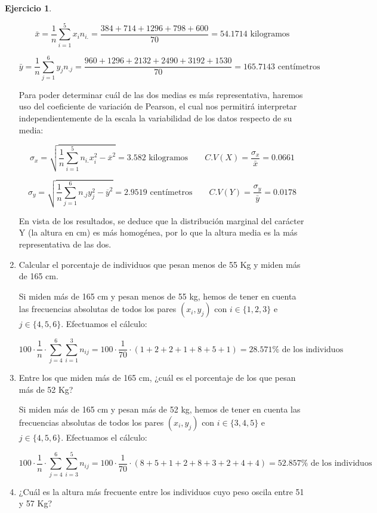 \documentclass[a4paper, 12pt]{article}
\theoremstyle{definition}
\newtheorem{ej}{Ejercicio}
\begin{document}
\begin{ej}
\begin{enumerate}[label=\alph*)]
\[
	\bar{x} = \frac{1}{n} \sum_{i=1}^{5} x_i n_{i.} = \frac{384+714+1296+798+600}{70} = 54.1714 \text{ kilogramos} 
\]

\[
	\bar{y} = \frac{1}{n} \sum_{j=1}^{6} y_j n_{.j} = \frac{960+1296+2132+2490+3192+1530}{70} = 165.7143 \text{ centímetros} 
\]

Para poder determinar cuál de las dos medias es más representativa, haremos uso del coeficiente de variación de Pearson, el cual nos permitirá interpretar independientemente de la escala la variabilidad de los datos respecto de su media:

\[
	\sigma_x = \sqrt{\frac{1}{n} \sum_{i=1}^{5} n_{i.} x_i^2 - \overline{x}^2} = 3.582 \text{ kilogramos} \qquad C.V(X) = \frac{\sigma_x}{\bar{x}} = 0.0661
\]

\[
	\sigma_y = \sqrt{\frac{1}{n} \sum_{j=1}^{6} n_{.j} y_j^2 - \overline{y}^2} = 2.9519 \text{ centímetros} \qquad C.V(Y) = \frac{\sigma_y}{\bar{y}} = 0.0178
\]

En vista de los resultados, se deduce que la distribución marginal del carácter Y (la altura en cm) es más homogénea, por lo que la altura media es la más representativa de las dos.

 \item Calcular el porcentaje de individuos que pesan menos de 55 Kg y miden más de 165 cm.
 
Si miden más de 165 cm y pesan menos de 55 kg, hemos de tener en cuenta las frecuencias absolutas de todos los pares $(x_i,y_j)$ con $i \in \{1,2,3\}$ e $j \in \{4,5,6\}$. Efectuamos el cálculo:

\[
	100 \cdot \frac{1}{n} \cdot \sum_{j=4}^{6}\sum_{i=1}^{3}n_{ij} = 100 \cdot \frac{1}{70} \cdot (1+2+2+1+8+5+1) = 28.571\% \text{ de los individuos} 
\]

\item Entre los que miden más de 165 cm, ¿cuál es el porcentaje de los que pesan más de 52 Kg?

Si miden más de 165 cm y pesan más de 52 kg, hemos de tener en cuenta las frecuencias absolutas de todos los pares $(x_i,y_j)$ con $i \in \{3,4,5\}$ e $j \in \{4,5,6\}$. Efectuamos el cálculo:

\[
	100 \cdot \frac{1}{n} \cdot \sum_{j=4}^{6}\sum_{i=3}^{5}n_{ij} = 100 \cdot \frac{1}{70} \cdot (8+5+1+2+8+3+2+4+4) = 52.857\% \text{ de los individuos} 
\]

\item ¿Cuál es la altura más frecuente entre los individuos cuyo peso oscila entre 51 y 57 Kg?


\end{enumerate}
\end{ej}
\end{document}
